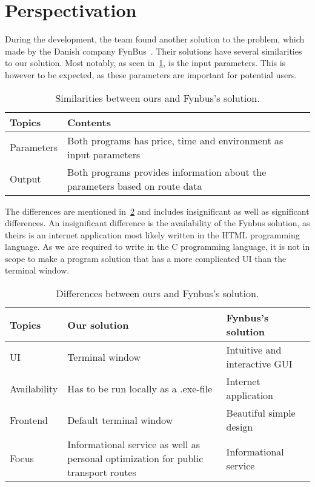 \section{Perspectivation}\label{sec:perspectivation}

During the development, the team found another solution to the problem, which made by the Danish company
FynBus~\cite{fynbus2023}.
Their solutions have several similarities to our solution.
Most notably, as seen in~\ref{tab:similarities-between-ours-and-fynbus's-solution}, is the input parameters.
This is however to be expected, as these parameters are important for potential users.

\begin{table}[ht]
    \centering
    \begin{tabular}{|l|p{5cm}|p{5cm}|}
        \hline
        \textbf{Topics} & \textbf{Contents} \\
        \hline
        Parameters & Both programs has price, time and environment as input parameters \\
        \hline
        Output & Both programs provides information about the parameters based on route data \\
        \hline
    \end{tabular}
    \caption{Similarities between ours and Fynbus's solution.}
    \label{tab:similarities-between-ours-and-fynbus's-solution}
\end{table}

The differences are mentioned in~\ref{tab:differences-between-ours-and-fynbus's-solution} and includes insignificant as
well as significant differences.
An insignificant difference is the availability of the Fynbus solution, as theirs is an internet application most
likely written in the HTML programming language.
As we are required to write in the C programming language, it is not in scope to make a program solution that has a more
complicated UI than the terminal window.

\begin{table}[ht]
    \centering
    \begin{tabular}{|l|p{5cm}|p{5cm}|}
        \hline
        \textbf{Topics} & \textbf{Our solution} & \textbf{Fynbus's solution} \\
        \hline
        UI & Terminal window & Intuitive and interactive GUI \\
        \hline
        Availability & Has to be run locally as a .exe-file & Internet application \\
        \hline
        Frontend & Default terminal window & Beautiful simple design \\
        \hline
        Focus & Informational service as well as personal optimization for public transport routes & Informational service \\
        \hline
    \end{tabular}
    \caption{Differences between ours and Fynbus's solution.}
    \label{tab:differences-between-ours-and-fynbus's-solution}
\end{table}

